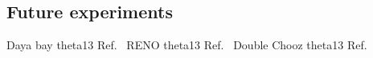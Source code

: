 \subsection{Future experiments}

Daya bay theta13 Ref.~\cite{an2012}
RENO theta13 Ref.~\cite{ahn2012}
Double Chooz theta13 Ref.~\cite{abe2012}

